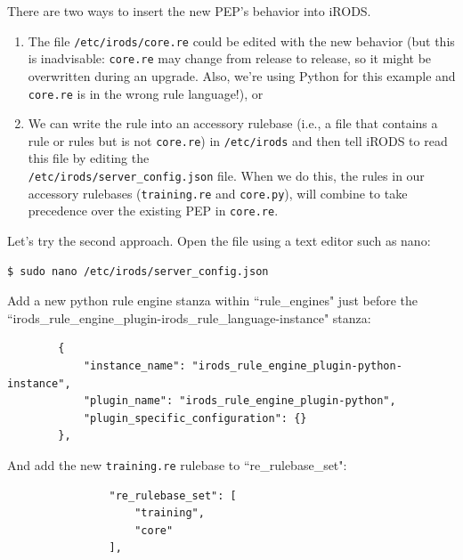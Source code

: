 \documentclass[10pt,oneside]{memoir}
\begin{document}
There are two ways to insert the new PEP's behavior into iRODS.
\begin{enumerate}
 \item The file \texttt{/etc/irods/core.re} could be edited with the new behavior (but this is inadvisable: \texttt{core.re} may change from release to release, so it might be overwritten during an upgrade.  Also, we're using Python for this example and \texttt{core.re} is in the wrong rule language!), or
 \item We can write the rule into an accessory rulebase (i.e., a file that contains a rule or rules but is not \texttt{core.re}) in \texttt{/etc/irods} and then tell iRODS to read this file by editing the \\ \texttt{/etc/irods/server\_config.json} file. When we do this, the rules in our accessory rulebases (\texttt{training.re} and \texttt{core.py}), will combine to take precedence over the existing PEP in \texttt{core.re}.
\end{enumerate}

Let's try the second approach. Open the file using a text editor such as nano:

\begin{lstlisting}
$ sudo nano /etc/irods/server_config.json
\end{lstlisting}

Add a new python rule engine stanza within ``rule\_engines" just before the ``irods\_rule\_engine\_plugin-irods\_rule\_language-instance" stanza:

\begin{lrbox}{\lstServerConfigA}
\begin{lstlisting}
        {
            "instance_name": "irods_rule_engine_plugin-python-instance",
            "plugin_name": "irods_rule_engine_plugin-python",
            "plugin_specific_configuration": {}
        },
\end{lstlisting}
\end{lrbox}
\href{https://github.com/irods/irods_training/blob/ugm2025/beginner/server_config.json#L41-L45}{\usebox{\lstServerConfigA}}

And add the new \texttt{training.re} rulebase to ``re\_rulebase\_set":

\begin{lrbox}{\lstServerConfigB}
\begin{lstlisting}
                "re_rulebase_set": [
                    "training",
                    "core"
                ],
\end{lstlisting}
\end{lrbox}
\href{https://github.com/irods/irods_training/blob/ugm2025/beginner/server_config.json#L56-L59}{\usebox{\lstServerConfigB}}
\end{document}
